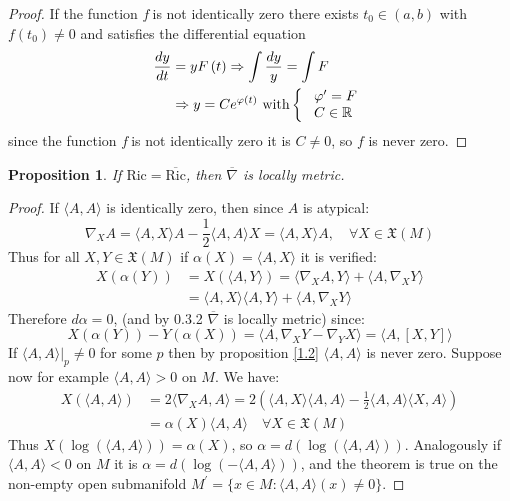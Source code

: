 \documentclass{amsart}%
\theoremstyle{plain}
\newtheorem{proposition}{Proposition}
\numberwithin{equation}{section}
\begin{document}
\begin{proof}
If the function $f\ $is not identically zero there exists $t_{0}\in(a,b)$ with
$f\left(  t_{0}\right)  \neq0$ and satisfies the differential equation%
\begin{align*}
\frac{dy}{dt}  &  =yF\left(  t\right)  \Rightarrow\int\frac{dy}{y}=\int F\\
&  \Rightarrow y=Ce^{\varphi\left(  t\right)  }\text{ with}\left\{
\begin{array}
[c]{c}%
\text{ }\varphi^{\prime}=F\\
C\in\mathbb{R}%
\end{array}
\right.
\end{align*}
since the function $f\ $is not identically zero it is $C\neq0$, so $f$ is
never zero.
\end{proof}

\begin{proposition}
\label{1.1}If $\mathrm{Ric}=\overline{\mathrm{Ric}}$, then $\overline{\nabla}$
is locally metric.
\end{proposition}

\begin{proof}
If $\langle A,A\rangle$ is identically zero, then since $A$ is atypical:
\[
\nabla_{X}A=\langle A,X\rangle A-\frac{1}{2}\langle A,A\rangle X=\langle
A,X\rangle A,\quad\forall X\in\mathfrak{X}(M)
\]
Thus for all $X,Y\in\mathfrak{X}(M)$ if $\alpha(X)=\langle A,X\rangle$ it is
verified:
\begin{align*}
X(\alpha(Y)) &  =X(\langle A,Y\rangle)=\langle\nabla_{X}A,Y\rangle+\langle
A,\nabla_{X}Y\rangle\\
&  =\langle A,X\rangle\langle A,Y\rangle+\langle A,\nabla_{X}Y\rangle
\end{align*}
Therefore $d\alpha=0$, (and by 0.3.2 $\overline{\nabla}$ is locally metric)
since:
\[
X(\alpha(Y))-Y(\alpha(X))=\langle A,\nabla_{X}Y-\nabla_{Y}X\rangle=\langle
A,[X,Y]\rangle
\]
If $\left.  \langle A,A\rangle\right\vert _{p}\neq0$ for some $p$ then by
proposition \ref{1.2} $\langle A,A\rangle$ is never zero. Suppose now for
example $\langle A,A\rangle>0$ on $M$. We have:
\begin{align*}
X(\langle A,A\rangle) &  =2\langle\nabla_{X}A,A\rangle=2(\langle
A,X\rangle\langle A,A\rangle-\frac{1}{2}\langle A,A\rangle\langle
X,A\rangle)\\
&  =\alpha(X)\langle A,A\rangle\quad\forall X\in\mathfrak{X}(M)
\end{align*}
Thus $X(\log(\langle A,A\rangle))=\alpha(X)$, so $\alpha=d(\log(\langle
A,A\rangle))$. Analogously if $\langle A,A\rangle<0$ on $M$ it is
$\alpha=d(\log(-\langle A,A\rangle))$, and the theorem is true on the
non-empty open submanifold $M^{\prime}=\{x\in M:\langle A,A\rangle(x)\neq0\}$.
\end{proof}
\end{document}

